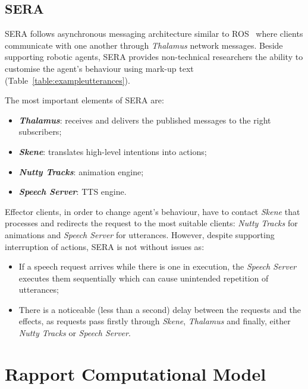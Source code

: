\subsection{\acl{SERA}}
\label{sub:sec:sera}

\acf{SERA} follows asynchronous messaging architecture similar to \ac{ROS}~\cite{Quigley2009} where clients communicate with one another through \textit{Thalamus} network messages. Beside supporting robotic agents, \ac{SERA} provides non-technical researchers the ability to customise the agent's behaviour using mark-up text (Table~\ref{table:exampleutterances}). 

The most important elements of \ac{SERA} are:
\begin{itemize}
	\item \textbf{\textit{Thalamus}}: receives and delivers the published messages to the right subscribers;
	\item \textbf{\textit{Skene}}: translates high-level intentions into actions;
	\item \textbf{\textit{Nutty Tracks}}: animation engine;
	\item \textbf{\textit{Speech Server}}: \ac{TTS} engine. 
\end{itemize}

Effector clients, in order to change agent's behaviour, have to contact \textit{Skene} that processes and redirects the request to the most suitable clients: \textit{Nutty Tracks} for animations and \textit{Speech Server} for utterances. However, despite supporting interruption of actions, \ac{SERA} is not without issues as:
\begin{itemize}
	\item If a speech request arrives while there is one in execution, the \textit{Speech Server} executes them sequentially which can cause unintended repetition of utterances;
	\item There is a noticeable (less than a second) delay between the requests and the effects, as requests pass firstly through \textit{Skene}, \textit{Thalamus} and finally, either \textit{Nutty Tracks} or \textit{Speech Server}.
\end{itemize}


\section{Rapport Computational Model}
\label{sub:rapportModel}

